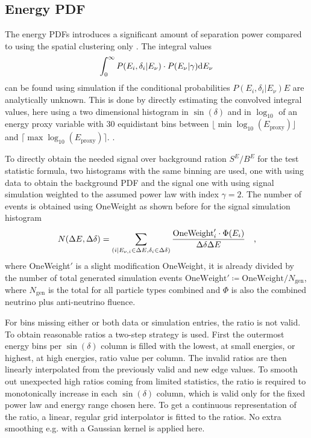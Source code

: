 \subsection*{Energy PDF}
The energy PDFs introduces a significant amount of separation power compared to using the spatial clustering only \cite{Braun:2008bg}.
The integral values
\begin{equation}
  \int_0^\infty P(E_i,\delta_i|E_\nu)\cdot P(E_\nu|\gamma) \mathrm{d}E_\nu
\end{equation}
can be found using simulation if the conditional probabilities $P(E_i,\delta_i|E_\nu)E$ are analytically unknown.
This is done by directly estimating the convolved integral values, here using a two dimensional histogram in $\sin(\delta)$ and in $\log_{10}$ of an energy proxy variable with $\num{30}$ equidistant bins between $\lfloor \min\log_{10}(E_\text{proxy}) \rfloor$ and $\lceil \max\log_{10}(E_\text{proxy}) \rceil$.
.

To directly obtain the needed signal over background ration $S^E / B^E$ for the test statistic formula, two histograms with the same binning are used, one with using data to obtain the background PDF and the signal one with using signal simulation weighted to the assumed power law with index $\gamma = 2$.
The number of events is obtained using OneWeight as shown before for the signal simulation histogram
\begin{equation}
  N(\Delta E, \Delta\delta)
  = \sum_{(i|E_{\nu,i}\in\Delta E, \delta_i\in\Delta\delta)}
    \frac{\text{OneWeight}'_i \cdot \Phi(E_i)}{\Delta\delta \Delta E}
  \quad\text{,}
\end{equation}
where OneWeight$'$ is a slight modification OneWeight, it is already divided by the number of total generated simulation events $\text{OneWeight}'\coloneqq\text{OneWeight}/N_\text{gen}$, where $N_\text{gen}$ is the total for all particle types combined and $\Phi$ is also the combined neutrino plus anti-neutrino fluence.

For bins missing either or both data or simulation entries, the ratio is not valid.
To obtain reasonable ratios a two-step strategy is used.
First the outermost energy bins per $\sin(\delta)$ column is filled with the lowest, at small energies, or highest, at high energies, ratio value per column.
The invalid ratios are then linearly interpolated from the previously valid and new edge values.
To smooth out unexpected high ratios coming from limited statistics, the ratio is required to monotonically increase in each $\sin(\delta)$ column, which is valid only for the fixed power law and energy range chosen here.
To get a continuous representation of the ratio, a linear, regular grid interpolator is fitted to the ratios.
No extra smoothing e.g. with a Gaussian kernel is applied here.

